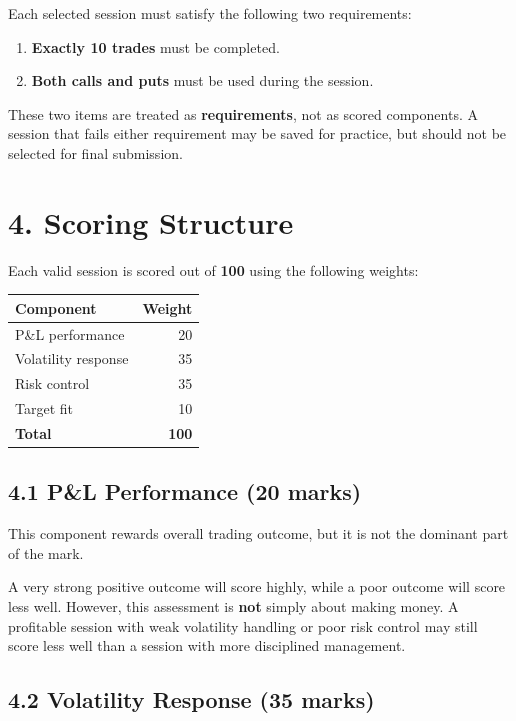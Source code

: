 \documentclass[11pt,a4paper]{article}
\begin{document}
Each selected session must satisfy the following two requirements:

\begin{enumerate}[leftmargin=1.5em]
\item \textbf{Exactly 10 trades} must be completed.
\item \textbf{Both calls and puts} must be used during the session.
\end{enumerate}

These two items are treated as \textbf{requirements}, not as scored components. A session that fails either requirement may be saved for practice, but should not be selected for final submission.

\section*{4. Scoring Structure}

Each valid session is scored out of \textbf{100} using the following weights:

\begin{center}
\begin{tabular}{lr}
\toprule
\textbf{Component} & \textbf{Weight} \\
\midrule
P\&L performance & 20 \\
Volatility response & 35 \\
Risk control & 35 \\
Target fit & 10 \\
\midrule
\textbf{Total} & \textbf{100} \\
\bottomrule
\end{tabular}
\end{center}

\subsection*{4.1 P\&L Performance (20 marks)}

This component rewards overall trading outcome, but it is not the dominant part of the mark.

A very strong positive outcome will score highly, while a poor outcome will score less well. However, this assessment is \textbf{not} simply about making money. A profitable session with weak volatility handling or poor risk control may still score less well than a session with more disciplined management.

\subsection*{4.2 Volatility Response (35 marks)}
\end{document}
